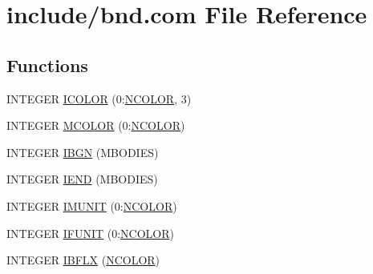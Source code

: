 \hypertarget{home_2abonfi_2_c_f_d__codes_2_eul_f_s_83_84_2include_2bnd_8com}{\section{include/bnd.com File Reference}
\label{home_2abonfi_2_c_f_d__codes_2_eul_f_s_83_84_2include_2bnd_8com}
}
\subsection*{Functions}
\begin{DoxyCompactItemize}
\item 
I\-N\-T\-E\-G\-E\-R \hyperlink{home_2abonfi_2_c_f_d__codes_2_eul_f_s_83_84_2include_2bnd_8com_a80aa0313e1ef320813f587804c852992}{I\-C\-O\-L\-O\-R} (0\-:\hyperlink{msa20_2home_2abonfi_2_c_f_d__codes_2_eul_f_s_83_82_83_2include_2bnd_8h_a9fc66e47390039de9cc3084bf6825fe1}{N\-C\-O\-L\-O\-R}, 3)
\item 
I\-N\-T\-E\-G\-E\-R \hyperlink{home_2abonfi_2_c_f_d__codes_2_eul_f_s_83_84_2include_2bnd_8com_a08b7d66e5deecd1c9a09cc14d9d107a8}{M\-C\-O\-L\-O\-R} (0\-:\hyperlink{msa20_2home_2abonfi_2_c_f_d__codes_2_eul_f_s_83_82_83_2include_2bnd_8h_a9fc66e47390039de9cc3084bf6825fe1}{N\-C\-O\-L\-O\-R})
\item 
I\-N\-T\-E\-G\-E\-R \hyperlink{home_2abonfi_2_c_f_d__codes_2_eul_f_s_83_84_2include_2bnd_8com_a4842eb20d87380d011dd06416621e6aa}{I\-B\-G\-N} (M\-B\-O\-D\-I\-E\-S)
\item 
I\-N\-T\-E\-G\-E\-R \hyperlink{home_2abonfi_2_c_f_d__codes_2_eul_f_s_83_84_2include_2bnd_8com_a1576f9b4b3ad9dc05bb01f76c628df7d}{I\-E\-N\-D} (M\-B\-O\-D\-I\-E\-S)
\item 
I\-N\-T\-E\-G\-E\-R \hyperlink{home_2abonfi_2_c_f_d__codes_2_eul_f_s_83_84_2include_2bnd_8com_a2057fcc57502be0c35ec28e1e55dd60d}{I\-M\-U\-N\-I\-T} (0\-:\hyperlink{msa20_2home_2abonfi_2_c_f_d__codes_2_eul_f_s_83_82_83_2include_2bnd_8h_a9fc66e47390039de9cc3084bf6825fe1}{N\-C\-O\-L\-O\-R})
\item 
I\-N\-T\-E\-G\-E\-R \hyperlink{home_2abonfi_2_c_f_d__codes_2_eul_f_s_83_84_2include_2bnd_8com_a39e875fb16285a881e304a8e836d5bf8}{I\-F\-U\-N\-I\-T} (0\-:\hyperlink{msa20_2home_2abonfi_2_c_f_d__codes_2_eul_f_s_83_82_83_2include_2bnd_8h_a9fc66e47390039de9cc3084bf6825fe1}{N\-C\-O\-L\-O\-R})
\item 
I\-N\-T\-E\-G\-E\-R \hyperlink{home_2abonfi_2_c_f_d__codes_2_eul_f_s_83_84_2include_2bnd_8com_addddb18e9abe37720d5601329ff81f6a}{I\-B\-F\-L\-X} (\hyperlink{msa20_2home_2abonfi_2_c_f_d__codes_2_eul_f_s_83_82_83_2include_2bnd_8h_a9fc66e47390039de9cc3084bf6825fe1}{N\-C\-O\-L\-O\-R})
\end{DoxyCompactItemize}


